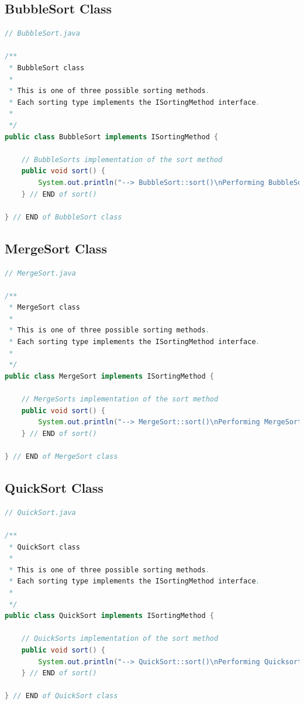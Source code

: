 \documentclass[12pt]{article}
\begin{document}
\subsection*{BubbleSort Class}
\begin{lstlisting}[language=Java]
// BubbleSort.java

/**
 * BubbleSort class
 *
 * This is one of three possible sorting methods.
 * Each sorting type implements the ISortingMethod interface.
 * 
 */
public class BubbleSort implements ISortingMethod {

    // BubbleSorts implementation of the sort method
    public void sort() {
        System.out.println("--> BubbleSort::sort()\nPerforming BubbleSort...");
    } // END of sort() 
    
} // END of BubbleSort class

\end{lstlisting}

\subsection*{MergeSort Class}
\begin{lstlisting}[language=Java]
// MergeSort.java

/**
 * MergeSort class
 *
 * This is one of three possible sorting methods.
 * Each sorting type implements the ISortingMethod interface.
 * 
 */
public class MergeSort implements ISortingMethod {

    // MergeSorts implementation of the sort method
    public void sort() {
        System.out.println("--> MergeSort::sort()\nPerforming MergeSort...");
    } // END of sort() 
    
} // END of MergeSort class

\end{lstlisting}

\subsection*{QuickSort Class}
\begin{lstlisting}[language=Java]
// QuickSort.java

/**
 * QuickSort class
 *
 * This is one of three possible sorting methods.
 * Each sorting type implements the ISortingMethod interface.
 * 
 */
public class QuickSort implements ISortingMethod {

    // QuickSorts implementation of the sort method
    public void sort() {
        System.out.println("--> QuickSort::sort()\nPerforming Quicksort...");
    } // END of sort() 
    
} // END of QuickSort class

\end{lstlisting}
\end{document}
